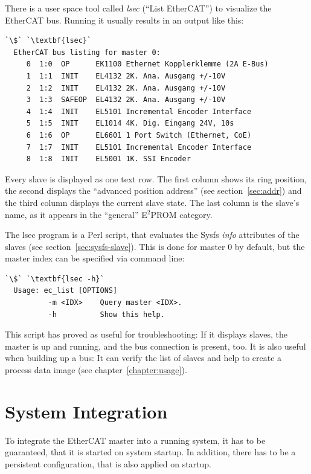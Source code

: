 \documentclass[a4paper,12pt,BCOR6mm,bibtotoc,idxtotoc]{scrbook}
\begin{document}
There is a user space tool called \textit{lsec} (``List
EtherCAT'') to visualize the EtherCAT bus. Running it usually results
in an output like this:

\begin{lstlisting}[gobble=2]
  `\$` `\textbf{lsec}`
  EtherCAT bus listing for master 0:
     0  1:0  OP      EK1100 Ethernet Kopplerklemme (2A E-Bus)
     1  1:1  INIT    EL4132 2K. Ana. Ausgang +/-10V
     2  1:2  INIT    EL4132 2K. Ana. Ausgang +/-10V
     3  1:3  SAFEOP  EL4132 2K. Ana. Ausgang +/-10V
     4  1:4  INIT    EL5101 Incremental Encoder Interface
     5  1:5  INIT    EL1014 4K. Dig. Eingang 24V, 10s
     6  1:6  OP      EL6601 1 Port Switch (Ethernet, CoE)
     7  1:7  INIT    EL5101 Incremental Encoder Interface
     8  1:8  INIT    EL5001 1K. SSI Encoder
\end{lstlisting}

Every slave is displayed as one text row. The first column shows its
ring position, the second displays the ``advanced position address''
(see section~\ref{sec:addr}) and the third column displays the current
slave state. The last column is the slave's name, as it appears in the
``general'' E$^2$PROM category.

The lsec program is a Perl script, that evaluates the Sysfs
\textit{info} attributes of the slaves (see
section~\ref{sec:sysfs-slave}). This is done for master $0$ by
default, but the master index can be specified via command line:

\begin{lstlisting}[gobble=2]
  `\$` `\textbf{lsec -h}`
  Usage: ec_list [OPTIONS]
          -m <IDX>    Query master <IDX>.
          -h          Show this help.
\end{lstlisting}

This script has proved as useful for troubleshooting: If it displays
slaves, the master is up and running, and the bus connection is
present, too. It is also useful when building up a bus: It can verify
the list of slaves and help to create a process data image (see
chapter~\ref{chapter:usage}).


\section{System Integration}
\label{sec:system}

To integrate the EtherCAT master into a running system, it has to be
guaranteed, that it is started on system startup. In addition, there has
to be a persistent configuration, that is also applied on startup.
\end{document}
